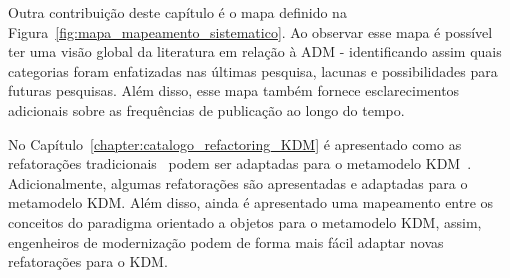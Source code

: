 Outra contribuição deste capítulo é o mapa definido na Figura~\ref{fig:mapa_mapeamento_sistematico}. Ao observar esse mapa é possível ter uma visão global da literatura em relação à ADM - identificando assim quais categorias foram enfatizadas nas últimas pesquisa, lacunas e possibilidades para futuras pesquisas. Além disso, esse mapa também fornece esclarecimentos adicionais sobre as frequências de publicação ao longo do tempo.

No Capítulo~\ref{chapter:catalogo_refactoring_KDM} é apresentado como as refatorações tradicionais~\cite{Fowler1999} podem ser adaptadas para o metamodelo KDM~\cite{durelli_catalogo, durelli_VEM_ferramenta}. Adicionalmente, algumas refatorações são apresentadas e adaptadas para o metamodelo KDM. Além disso, ainda é apresentado uma mapeamento entre os conceitos do paradigma orientado a objetos para o metamodelo KDM, assim, engenheiros de modernização podem de forma mais fácil adaptar novas refatorações para o KDM.